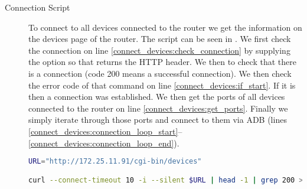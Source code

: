 \begin{description}
  \item[Connection Script] To connect to all devices connected to the router we get the information on the devices page of the router. The script can be seen in . We first check the connection on line \ref{connect_devices:check_connection} by supplying the  option so that  returns the HTTP header. We then  to check that there is a connection (code 200 means a successful connection). We then check the error code of that command on line \ref{connect_devices:if_start}. If it is  then a connection was established. We then get the ports of all devices connected to the router on line \ref{connect_devices:get_ports}. Finally we simply iterate through those ports and connect to them via ADB (lines \ref{connect_devices:connection_loop_start}--\ref{connect_devices:connection_loop_end}).

  \begin{lstlisting}[language=bash,caption=Script that connects to devices,label=lst:connect_devices]
URL="http://172.25.11.91/cgi-bin/devices"

curl --connect-timeout 10 -i --silent $URL | head -1 | grep 200 > /dev/null (*@\label{connect_devices:check_connection}@*)


\end{lstlisting}
\end{description}
